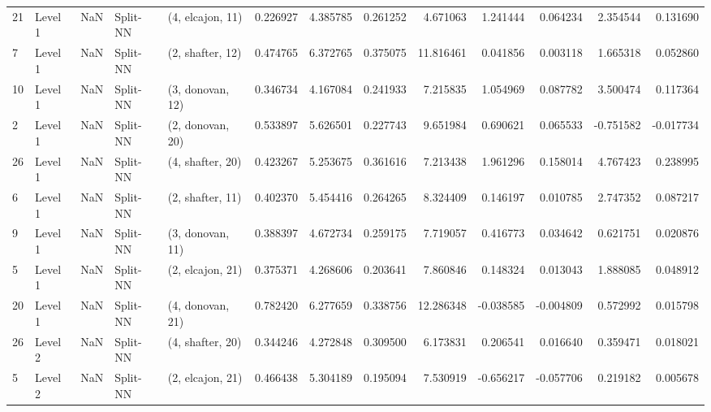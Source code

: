 \begin{tabular}{llrllrrrrrrrr}
21 &   Level 1 &    NaN &       Split-NN &  (4, elcajon, 11) &   0.226927 &   4.385785 &  0.261252 &   4.671063 &             1.241444 &               0.064234 &            2.354544 &              0.131690 \\
7  &   Level 1 &    NaN &       Split-NN &  (2, shafter, 12) &   0.474765 &   6.372765 &  0.375075 &  11.816461 &             0.041856 &               0.003118 &            1.665318 &              0.052860 \\
10 &   Level 1 &    NaN &       Split-NN &  (3, donovan, 12) &   0.346734 &   4.167084 &  0.241933 &   7.215835 &             1.054969 &               0.087782 &            3.500474 &              0.117364 \\
2  &   Level 1 &    NaN &       Split-NN &  (2, donovan, 20) &   0.533897 &   5.626501 &  0.227743 &   9.651984 &             0.690621 &               0.065533 &           -0.751582 &             -0.017734 \\
26 &   Level 1 &    NaN &       Split-NN &  (4, shafter, 20) &   0.423267 &   5.253675 &  0.361616 &   7.213438 &             1.961296 &               0.158014 &            4.767423 &              0.238995 \\
6  &   Level 1 &    NaN &       Split-NN &  (2, shafter, 11) &   0.402370 &   5.454416 &  0.264265 &   8.324409 &             0.146197 &               0.010785 &            2.747352 &              0.087217 \\
9  &   Level 1 &    NaN &       Split-NN &  (3, donovan, 11) &   0.388397 &   4.672734 &  0.259175 &   7.719057 &             0.416773 &               0.034642 &            0.621751 &              0.020876 \\
5  &   Level 1 &    NaN &       Split-NN &  (2, elcajon, 21) &   0.375371 &   4.268606 &  0.203641 &   7.860846 &             0.148324 &               0.013043 &            1.888085 &              0.048912 \\
20 &   Level 1 &    NaN &       Split-NN &  (4, donovan, 21) &   0.782420 &   6.277659 &  0.338756 &  12.286348 &            -0.038585 &              -0.004809 &            0.572992 &              0.015798 \\
26 &   Level 2 &    NaN &       Split-NN &  (4, shafter, 20) &   0.344246 &   4.272848 &  0.309500 &   6.173831 &             0.206541 &               0.016640 &            0.359471 &              0.018021 \\
5  &   Level 2 &    NaN &       Split-NN &  (2, elcajon, 21) &   0.466438 &   5.304189 &  0.195094 &   7.530919 &            -0.656217 &              -0.057706 &            0.219182 &              0.005678 \\

\end{tabular}
